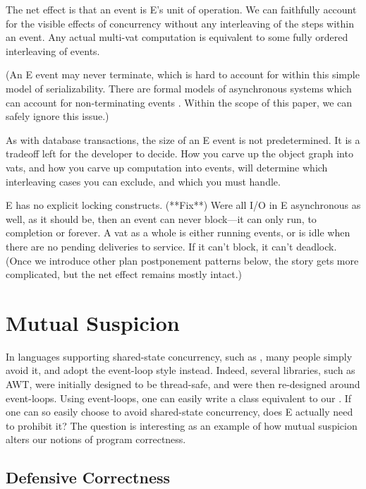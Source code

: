 \documentclass{llncs}
\begin{document}
The net effect is that an event is E's unit of operation. We can
faithfully account for the visible effects of concurrency without any
interleaving of the steps within an event. Any actual multi-vat
computation is equivalent to some fully ordered interleaving of
events.

(An E event may never terminate, which is hard to account for within
this simple model of serializability. There are formal models of
asynchronous systems which can account for non-terminating events
\cite{chandy:snapshots}. Within the scope of this paper, we can safely
ignore this issue.)

As with database transactions, the size of an E event is not
predetermined. It is a tradeoff left for the developer to decide. How
you carve up the object graph into vats, and how you carve up
computation into events, will determine which interleaving cases you
can exclude, and which you must handle.

E has no explicit locking constructs. (**Fix**) Were all I/O in E
asynchronous as well, as it should be, then an event can never
block---it can only run, to completion or forever. A vat as a whole is
either running events, or is idle when there are no pending deliveries
to service. If it can't block, it can't deadlock. (Once we introduce
other plan postponement patterns below, the story gets more
complicated, but the net effect remains mostly intact.)

\section{Mutual Suspicion}

In languages supporting shared-state concurrency, such as , many
people simply avoid it, and adopt the event-loop style
instead. Indeed, several  libraries, such as AWT, were initially
designed to be thread-safe, and were then re-designed around
event-loops. Using event-loops, one can easily write a  class
equivalent to our . If one can so easily choose to
avoid shared-state concurrency, does E actually need to prohibit it?
The question is interesting as an example of how mutual suspicion
alters our notions of program correctness.

\subsection{Defensive Correctness}
\end{document}
